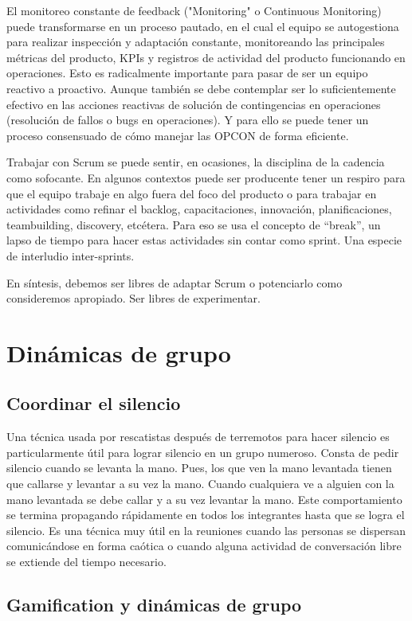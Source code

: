 El monitoreo constante de feedback ("Monitoring" o Continuous Monitoring) puede transformarse en un proceso pautado, en el cual el equipo se autogestiona para realizar inspección y adaptación constante, monitoreando las principales métricas del producto, KPIs y registros de actividad del producto funcionando en operaciones. Esto es radicalmente importante para pasar de ser un equipo reactivo a proactivo. Aunque también se debe contemplar ser lo suficientemente efectivo en las acciones reactivas de solución de contingencias en operaciones (resolución de fallos o bugs en operaciones). Y para ello se puede tener un proceso consensuado de cómo manejar las OPCON de forma eficiente.

Trabajar con Scrum se puede sentir, en ocasiones, la disciplina de la cadencia como sofocante. En algunos contextos puede ser producente tener un respiro para que el equipo trabaje en algo fuera del foco del producto o para trabajar en actividades como refinar el backlog, capacitaciones, innovación, planificaciones, teambuilding, discovery, etcétera. Para eso se usa el concepto de “break”, un lapso de tiempo para hacer estas actividades sin contar como sprint. Una especie de interludio inter-sprints.

En síntesis, debemos ser libres de adaptar Scrum o potenciarlo como consideremos apropiado. Ser libres de experimentar.

\newpage
\section{Dinámicas de grupo}
\subsection{Coordinar el silencio}

Una técnica usada por rescatistas después de terremotos para hacer silencio es particularmente útil para lograr silencio en un grupo numeroso. Consta de pedir silencio cuando se levanta la mano. Pues, los que ven la mano levantada tienen que callarse y levantar a su vez la mano. Cuando cualquiera ve a alguien con la mano levantada se debe callar y a su vez levantar la mano. Este comportamiento se termina propagando rápidamente en todos los integrantes hasta que se logra el silencio. Es una técnica muy útil en la reuniones cuando las personas se dispersan comunicándose en forma caótica o cuando alguna actividad de conversación libre se extiende del tiempo necesario.

\subsection{Gamification y dinámicas de grupo}

